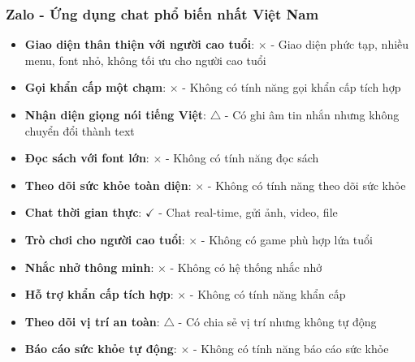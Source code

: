 \documentclass[12pt,a4paper]{article}
\begin{document}
\subsubsection{Zalo - Ứng dụng chat phổ biến nhất Việt Nam}
\begin{itemize}[leftmargin=2cm]
    \item \textbf{Giao diện thân thiện với người cao tuổi}: $\times$ - Giao diện phức tạp, nhiều menu, font nhỏ, không tối ưu cho người cao tuổi
    \item \textbf{Gọi khẩn cấp một chạm}: $\times$ - Không có tính năng gọi khẩn cấp tích hợp
    \item \textbf{Nhận diện giọng nói tiếng Việt}: $\triangle$ - Có ghi âm tin nhắn nhưng không chuyển đổi thành text
    \item \textbf{Đọc sách với font lớn}: $\times$ - Không có tính năng đọc sách
    \item \textbf{Theo dõi sức khỏe toàn diện}: $\times$ - Không có tính năng theo dõi sức khỏe
    \item \textbf{Chat thời gian thực}: $\checkmark$ - Chat real-time, gửi ảnh, video, file
    \item \textbf{Trò chơi cho người cao tuổi}: $\times$ - Không có game phù hợp lứa tuổi
    \item \textbf{Nhắc nhở thông minh}: $\times$ - Không có hệ thống nhắc nhở

    \item \textbf{Hỗ trợ khẩn cấp tích hợp}: $\times$ - Không có tính năng khẩn cấp
    \item \textbf{Theo dõi vị trí an toàn}: $\triangle$ - Có chia sẻ vị trí nhưng không tự động
    \item \textbf{Báo cáo sức khỏe tự động}: $\times$ - Không có tính năng báo cáo sức khỏe
\end{itemize}
\end{document}
